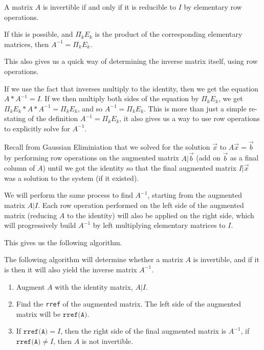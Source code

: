 \documentclass{ximera}
\begin{document}
\begin{theorem}\label{th:prod-elementary}
  A matrix $A$ is invertible if and
  only if it is reducible to $I$ by elementary row operations.

  If this is possible, and $\Pi_kE_k$ is the product of the corresponding elementary matrices, then $A^{-1}=\Pi_kE_k$.
\end{theorem}

This also gives us a quick way of determining the inverse matrix itself, using row operations.

\begin{remark}
  If we use the fact that inverses multiply to the identity, then we get the equation $A*A^{-1}=I$. If we then multiply both sides of the equation by $\Pi_kE_k$, we get $\Pi_kE_k*A*A^{-1}=\Pi_kE_k$, and so $A^{-1}=\Pi_kE_k$. This is more than just a simple re-stating of the definition $A^{-1}=\Pi_kE_k$, it also gives us a way to use row operations to explicitly solve for $A^{-1}$. 
  
  Recall from Gaussian Eliminiation that we solved for the solution $\vec{x}$ to $A\vec{x}=\vec{b}$ by performing row operations on the augmented matrix $A|\vec{b}$ (add on $\vec{b}$ as a final column of $A$) until we got the identity so that the final augmented matrix $I|\vec{x}$ was a solution to the system (if it existed).

  We will perform the same process to find $A^{-1}$, starting from the augmented matrix $A|I$. Each row operation performed on the left side of the augmented matrix (reducing $A$ to the identity) will also be applied on the right side, which will progressively build $A^{-1}$ by left multiplying elementary matrices to $I$.
\end{remark}

This gives us the following algorithm. 

\begin{theorem}\label{thm:prod-elementary}
  The following algorithm will determine whether a matrix $A$ is invertible, and if it is then it will also yield the inverse matrix $A^{-1}$.
  \begin{enumerate}
    \item Augment $A$ with the identity matrix, $A|I$.
    \item Find the \texttt{rref} of the augmented matrix. The left side of the augmented matrix will be $\texttt{rref(A)}$.
    \item If $\texttt{rref(A)}=I$, then the right side of the final augmented matrix is $A^{-1}$, if $\texttt{rref(A)}\neq I$, then $A$ is not invertible.
  \end{enumerate}
\end{theorem}
\end{document}

